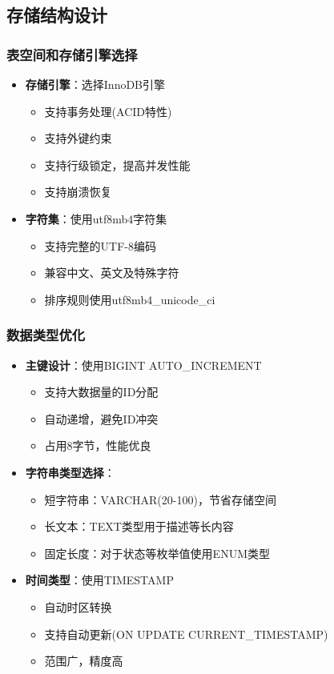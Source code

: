 \documentclass[12pt,a4paper]{article}
\begin{document}
\subsection{存储结构设计}

\subsubsection{表空间和存储引擎选择}
\begin{itemize}
    \item \textbf{存储引擎}：选择InnoDB引擎
    \begin{itemize}
        \item 支持事务处理(ACID特性)
        \item 支持外键约束
        \item 支持行级锁定，提高并发性能
        \item 支持崩溃恢复
    \end{itemize}
    
    \item \textbf{字符集}：使用utf8mb4字符集
    \begin{itemize}
        \item 支持完整的UTF-8编码
        \item 兼容中文、英文及特殊字符
        \item 排序规则使用utf8mb4\_unicode\_ci
    \end{itemize}
\end{itemize}

\subsubsection{数据类型优化}
\begin{itemize}
    \item \textbf{主键设计}：使用BIGINT AUTO\_INCREMENT
    \begin{itemize}
        \item 支持大数据量的ID分配
        \item 自动递增，避免ID冲突
        \item 占用8字节，性能优良
    \end{itemize}
    
    \item \textbf{字符串类型选择}：
    \begin{itemize}
        \item 短字符串：VARCHAR(20-100)，节省存储空间
        \item 长文本：TEXT类型用于描述等长内容
        \item 固定长度：对于状态等枚举值使用ENUM类型
    \end{itemize}
    
    \item \textbf{时间类型}：使用TIMESTAMP
    \begin{itemize}
        \item 自动时区转换
        \item 支持自动更新(ON UPDATE CURRENT\_TIMESTAMP)
        \item 范围广，精度高
    \end{itemize}
\end{itemize}
\end{document}
